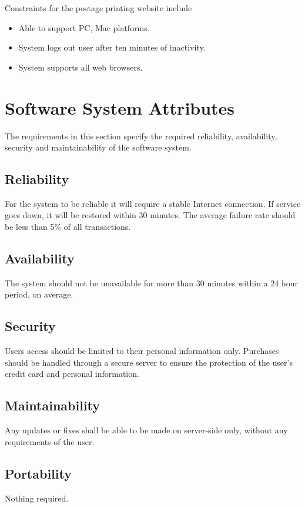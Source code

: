 \documentclass{scrreprt}
\begin{document}
Constraints for the postage printing website include

\begin{itemize}
\item Able to support PC, Mac platforms.
\item System logs out user after ten minutes of inactivity.
\item System supports all web browsers.
\end{itemize}

\section{Software System Attributes}

The requirements in this section specify the required reliability,
availability, security and maintainability of the software system.

\subsection{Reliability}

For the system to be reliable it will require a stable Internet connection. If
service goes down, it will be restored within 30 minutes. The average failure
rate should be less than 5\% of all transactions.

\subsection{Availability}

The system should not be unavailable for more than 30 minutes within a 24 hour
period, on average.

\subsection{Security}

Users access should be limited to their personal information only. Purchases
should be handled through a secure server to ensure the protection of the
user’s credit card and personal information.

\subsection{Maintainability}

Any updates or ﬁxes shall be able to be made on server-side only, without any
requirements of the user.

\subsection{Portability}

Nothing required.

\end{document}
